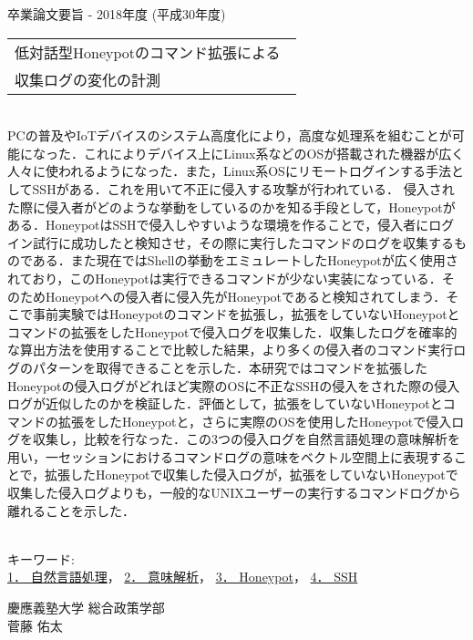 卒業論文要旨 - 2018年度 (平成30年度)
\begin{center}
\begin{large}
\begin{tabular}{|M{0.97\linewidth}|}
    \hline
   低対話型Honeypotのコマンド拡張による\\収集ログの変化の計測\\
    \hline
\end{tabular}
\end{large}
\end{center}

~ \\

PCの普及やIoTデバイスのシステム高度化により，高度な処理系を組むことが可能になった．これによりデバイス上にLinux系などのOSが搭載された機器が広く人々に使われるようになった．また，Linux系OSにリモートログインする手法としてSSHがある．これを用いて不正に侵入する攻撃が行われている．
侵入された際に侵入者がどのような挙動をしているのかを知る手段として，Honeypotがある．HoneypotはSSHで侵入しやすいような環境を作ることで，侵入者にログイン試行に成功したと検知させ，その際に実行したコマンドのログを収集するものである．また現在ではShellの挙動をエミュレートしたHoneypotが広く使用されており，このHoneypotは実行できるコマンドが少ない実装になっている．そのためHoneypotへの侵入者に侵入先がHoneypotであると検知されてしまう．そこで事前実験ではHoneypotのコマンドを拡張し，拡張をしていないHoneypotとコマンドの拡張をしたHoneypotで侵入ログを収集した．収集したログを確率的な算出方法を使用することで比較した結果，より多くの侵入者のコマンド実行ログのパターンを取得できることを示した．本研究ではコマンドを拡張したHoneypotの侵入ログがどれほど実際のOSに不正なSSHの侵入をされた際の侵入ログが近似したのかを検証した．評価として，拡張をしていないHoneypotとコマンドの拡張をしたHoneypotと，さらに実際のOSを使用したHoneypotで侵入ログを収集し，比較を行なった．この3つの侵入ログを自然言語処理の意味解析を用い，一セッションにおけるコマンドログの意味をベクトル空間上に表現することで，拡張したHoneypotで収集した侵入ログが，拡張をしていないHoneypotで収集した侵入ログよりも，一般的なUNIXユーザーの実行するコマンドログから離れることを示した．

~ \\
キーワード:\\
\underline{1． 自然言語処理}，
\underline{2． 意味解析}，
\underline{3． Honeypot}，
\underline{4． SSH}
\begin{flushright}
慶應義塾大学 総合政策学部\\
菅藤 佑太
\end{flushright}
